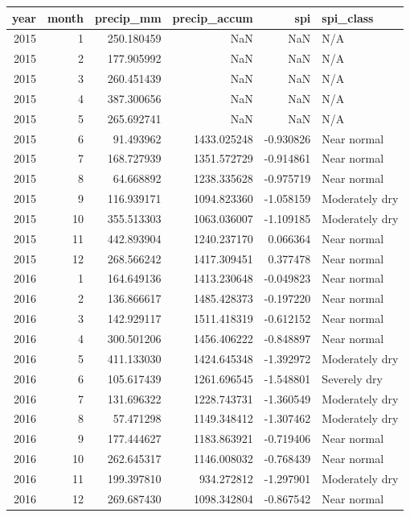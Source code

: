 \begin{tabular}{rrrrrl}
\toprule
year & month & precip\_mm & precip\_accum & spi & spi\_class \\
\midrule
2015 & 1 & 250.180459 & NaN & NaN & N/A \\
2015 & 2 & 177.905992 & NaN & NaN & N/A \\
2015 & 3 & 260.451439 & NaN & NaN & N/A \\
2015 & 4 & 387.300656 & NaN & NaN & N/A \\
2015 & 5 & 265.692741 & NaN & NaN & N/A \\
2015 & 6 & 91.493962 & 1433.025248 & -0.930826 & Near normal \\
2015 & 7 & 168.727939 & 1351.572729 & -0.914861 & Near normal \\
2015 & 8 & 64.668892 & 1238.335628 & -0.975719 & Near normal \\
2015 & 9 & 116.939171 & 1094.823360 & -1.058159 & Moderately dry \\
2015 & 10 & 355.513303 & 1063.036007 & -1.109185 & Moderately dry \\
2015 & 11 & 442.893904 & 1240.237170 & 0.066364 & Near normal \\
2015 & 12 & 268.566242 & 1417.309451 & 0.377478 & Near normal \\
2016 & 1 & 164.649136 & 1413.230648 & -0.049823 & Near normal \\
2016 & 2 & 136.866617 & 1485.428373 & -0.197220 & Near normal \\
2016 & 3 & 142.929117 & 1511.418319 & -0.612152 & Near normal \\
2016 & 4 & 300.501206 & 1456.406222 & -0.848897 & Near normal \\
2016 & 5 & 411.133030 & 1424.645348 & -1.392972 & Moderately dry \\
2016 & 6 & 105.617439 & 1261.696545 & -1.548801 & Severely dry \\
2016 & 7 & 131.696322 & 1228.743731 & -1.360549 & Moderately dry \\
2016 & 8 & 57.471298 & 1149.348412 & -1.307462 & Moderately dry \\
2016 & 9 & 177.444627 & 1183.863921 & -0.719406 & Near normal \\
2016 & 10 & 262.645317 & 1146.008032 & -0.768439 & Near normal \\
2016 & 11 & 199.397810 & 934.272812 & -1.297901 & Moderately dry \\
2016 & 12 & 269.687430 & 1098.342804 & -0.867542 & Near normal \\

\end{tabular}
